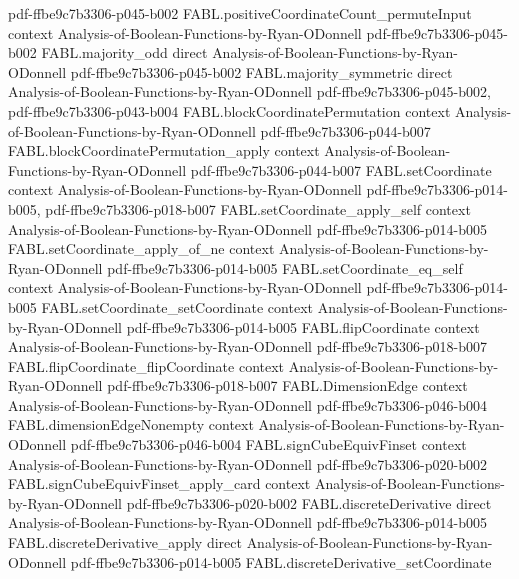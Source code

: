 \begin{theorem}
  {pdf-ffbe9c7b3306-p045-b002}
\proofstep
  {FABL.positiveCoordinateCount_permuteInput}
  {context}
  {Analysis-of-Boolean-Functions-by-Ryan-ODonnell}
  {pdf-ffbe9c7b3306-p045-b002}
\proofstep
  {FABL.majority_odd}
  {direct}
  {Analysis-of-Boolean-Functions-by-Ryan-ODonnell}
  {pdf-ffbe9c7b3306-p045-b002}
\proofstep
  {FABL.majority_symmetric}
  {direct}
  {Analysis-of-Boolean-Functions-by-Ryan-ODonnell}
  {pdf-ffbe9c7b3306-p045-b002,
    pdf-ffbe9c7b3306-p043-b004}
\proofstep
  {FABL.blockCoordinatePermutation}
  {context}
  {Analysis-of-Boolean-Functions-by-Ryan-ODonnell}
  {pdf-ffbe9c7b3306-p044-b007}
\proofstep
  {FABL.blockCoordinatePermutation_apply}
  {context}
  {Analysis-of-Boolean-Functions-by-Ryan-ODonnell}
  {pdf-ffbe9c7b3306-p044-b007}
\proofstep
  {FABL.setCoordinate}
  {context}
  {Analysis-of-Boolean-Functions-by-Ryan-ODonnell}
  {pdf-ffbe9c7b3306-p014-b005,
    pdf-ffbe9c7b3306-p018-b007}
\proofstep
  {FABL.setCoordinate_apply_self}
  {context}
  {Analysis-of-Boolean-Functions-by-Ryan-ODonnell}
  {pdf-ffbe9c7b3306-p014-b005}
\proofstep
  {FABL.setCoordinate_apply_of_ne}
  {context}
  {Analysis-of-Boolean-Functions-by-Ryan-ODonnell}
  {pdf-ffbe9c7b3306-p014-b005}
\proofstep
  {FABL.setCoordinate_eq_self}
  {context}
  {Analysis-of-Boolean-Functions-by-Ryan-ODonnell}
  {pdf-ffbe9c7b3306-p014-b005}
\proofstep
  {FABL.setCoordinate_setCoordinate}
  {context}
  {Analysis-of-Boolean-Functions-by-Ryan-ODonnell}
  {pdf-ffbe9c7b3306-p014-b005}
\proofstep
  {FABL.flipCoordinate}
  {context}
  {Analysis-of-Boolean-Functions-by-Ryan-ODonnell}
  {pdf-ffbe9c7b3306-p018-b007}
\proofstep
  {FABL.flipCoordinate_flipCoordinate}
  {context}
  {Analysis-of-Boolean-Functions-by-Ryan-ODonnell}
  {pdf-ffbe9c7b3306-p018-b007}
\proofstep
  {FABL.DimensionEdge}
  {context}
  {Analysis-of-Boolean-Functions-by-Ryan-ODonnell}
  {pdf-ffbe9c7b3306-p046-b004}
\proofstep
  {FABL.dimensionEdgeNonempty}
  {context}
  {Analysis-of-Boolean-Functions-by-Ryan-ODonnell}
  {pdf-ffbe9c7b3306-p046-b004}
\proofstep
  {FABL.signCubeEquivFinset}
  {context}
  {Analysis-of-Boolean-Functions-by-Ryan-ODonnell}
  {pdf-ffbe9c7b3306-p020-b002}
\proofstep
  {FABL.signCubeEquivFinset_apply_card}
  {context}
  {Analysis-of-Boolean-Functions-by-Ryan-ODonnell}
  {pdf-ffbe9c7b3306-p020-b002}
\proofstep
  {FABL.discreteDerivative}
  {direct}
  {Analysis-of-Boolean-Functions-by-Ryan-ODonnell}
  {pdf-ffbe9c7b3306-p014-b005}
\proofstep
  {FABL.discreteDerivative_apply}
  {direct}
  {Analysis-of-Boolean-Functions-by-Ryan-ODonnell}
  {pdf-ffbe9c7b3306-p014-b005}
\proofstep
  {FABL.discreteDerivative_setCoordinate}

\end{theorem}
